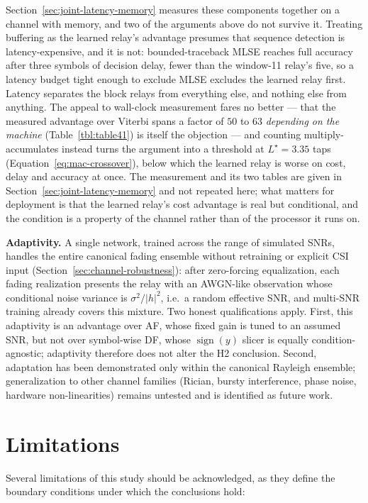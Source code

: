 Section~\ref{sec:joint-latency-memory} measures these components together on a channel with memory, and two of the arguments above do not survive it. Treating buffering as the learned relay's advantage presumes that sequence detection is latency-expensive, and it is not: bounded-traceback MLSE reaches full accuracy after three symbols of decision delay, fewer than the window-11 relay's five, so a latency budget tight enough to exclude MLSE excludes the learned relay first. Latency separates the block relays from everything else, and nothing else from anything. The appeal to wall-clock measurement fares no better --- that the measured advantage over Viterbi spans a factor of $50$ to $63$ \emph{depending on the machine} (Table~\ref{tbl:table41}) is itself the objection --- and counting multiply-accumulates instead turns the argument into a threshold at $L^{\star}=3.35$ taps (Equation~\ref{eq:mac-crossover}), below which the learned relay is worse on cost, delay and accuracy at once. The measurement and its two tables are given in Section~\ref{sec:joint-latency-memory} and not repeated here; what matters for deployment is that the learned relay's cost advantage is real but conditional, and the condition is a property of the channel rather than of the processor it runs on.

\textbf{Adaptivity.} A single network, trained across the range of simulated SNRs, handles the entire canonical fading ensemble without retraining or explicit CSI input (Section~\ref{sec:channel-robustness}): after zero-forcing equalization, each fading realization presents the relay with an AWGN-like observation whose conditional noise variance is $\sigma^{2}/|h|^{2}$, i.e.\ a random effective SNR, and multi-SNR training already covers this mixture. Two honest qualifications apply. First, this adaptivity is an advantage over AF, whose fixed gain is tuned to an assumed SNR, but not over symbol-wise DF, whose $\operatorname{sign}(y)$ slicer is equally condition-agnostic; adaptivity therefore does not alter the H2 conclusion. Second, adaptation has been demonstrated only within the canonical Rayleigh ensemble; generalization to other channel families (Rician, bursty interference, phase noise, hardware non-linearities) remains untested and is identified as future work.

\section{Limitations}\label{sec:limitations}

Several limitations of this study should be acknowledged, as they define the boundary conditions under which the conclusions hold:

